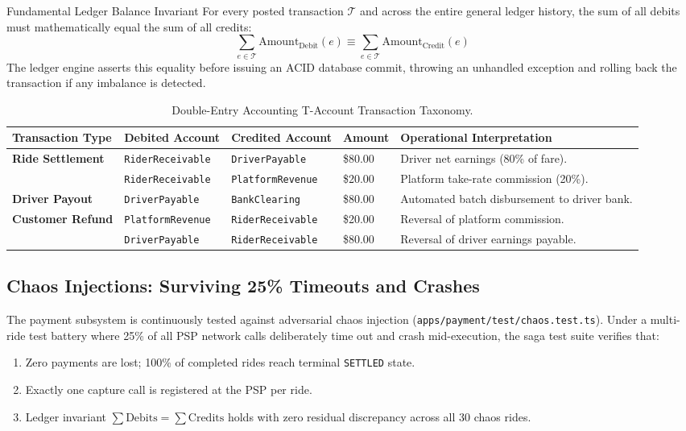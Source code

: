 \documentclass[11pt,a4paper]{article}
\begin{document}
\begin{invariantbox}{Fundamental Ledger Balance Invariant}
For every posted transaction $\mathcal{T}$ and across the entire general ledger history, the sum of all debits must mathematically equal the sum of all credits:
\begin{equation}
    \sum_{e \in \mathcal{T}} \text{Amount}_{\text{Debit}}(e) \equiv \sum_{e \in \mathcal{T}} \text{Amount}_{\text{Credit}}(e)
\end{equation}
The ledger engine asserts this equality before issuing an ACID database commit, throwing an unhandled exception and rolling back the transaction if any imbalance is detected.
\end{invariantbox}

\begin{table}[htbp]
\centering
\small
\begin{tabularx}{\textwidth}{l l l l X}
\toprule
\textbf{Transaction Type} & \textbf{Debited Account} & \textbf{Credited Account} & \textbf{Amount} & \textbf{Operational Interpretation} \\
\midrule
\textbf{Ride Settlement} & \texttt{RiderReceivable} & \texttt{DriverPayable} & \$80.00 & Driver net earnings (80\% of fare). \\
& \texttt{RiderReceivable} & \texttt{PlatformRevenue} & \$20.00 & Platform take-rate commission (20\%). \\
\rowcolor{HexLightBg}
\textbf{Driver Payout} & \texttt{DriverPayable} & \texttt{BankClearing} & \$80.00 & Automated batch disbursement to driver bank. \\
\textbf{Customer Refund} & \texttt{PlatformRevenue} & \texttt{RiderReceivable} & \$20.00 & Reversal of platform commission. \\
\rowcolor{HexLightBg}
& \texttt{DriverPayable} & \texttt{RiderReceivable} & \$80.00 & Reversal of driver earnings payable. \\
\bottomrule
\end{tabularx}
\caption{Double-Entry Accounting T-Account Transaction Taxonomy.}
\label{tab:ledger_accounts}
\end{table}

\subsection{Chaos Injections: Surviving 25\% Timeouts and Crashes}
The payment subsystem is continuously tested against adversarial chaos injection (\texttt{apps/payment/test/chaos.test.ts}). Under a multi-ride test battery where 25\% of all PSP network calls deliberately time out and crash mid-execution, the saga test suite verifies that:
\begin{enumerate}[leftmargin=1.5em]
    \item Zero payments are lost; 100\% of completed rides reach terminal \texttt{SETTLED} state.
    \item Exactly one capture call is registered at the PSP per ride.
    \item Ledger invariant $\sum \text{Debits} = \sum \text{Credits}$ holds with zero residual discrepancy across all 30 chaos rides.
\end{enumerate}
\end{document}
